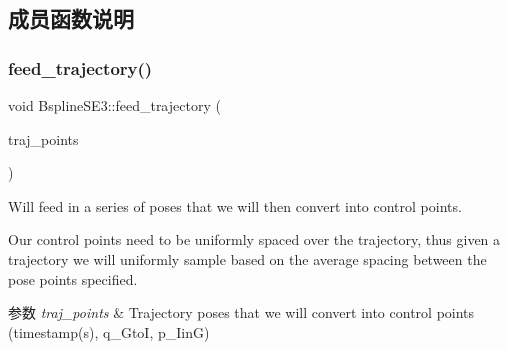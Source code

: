 \subsection{成员函数说明}
\mbox{\label{classov__core_1_1BsplineSE3_a2031f15f618b1e4654f5933a987b1cd2}} 
\subsubsection{\texorpdfstring{feed\+\_\+trajectory()}{feed\_trajectory()}}
{\footnotesize\ttfamily void Bspline\+S\+E3\+::feed\+\_\+trajectory (\begin{DoxyParamCaption}\item[{std\+::vector$<$ Eigen\+::\+Vector\+Xd $>$}]{traj\+\_\+points }\end{DoxyParamCaption})}



Will feed in a series of poses that we will then convert into control points. 

Our control points need to be uniformly spaced over the trajectory, thus given a trajectory we will uniformly sample based on the average spacing between the pose points specified.


\begin{DoxyParams}{参数}
{\em traj\+\_\+points} & Trajectory poses that we will convert into control points (timestamp(s), q\+\_\+\+GtoI, p\+\_\+\+IinG) \\
\hline
\end{DoxyParams}
\mbox{\label{classov__core_1_1BsplineSE3_af03bc0e8df3f77134afa0a24a425be80}} 
